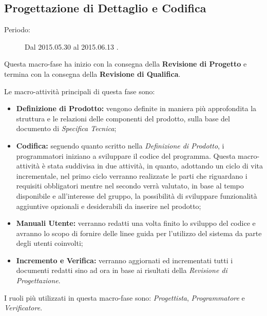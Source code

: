 \newpage
\subsection{Progettazione di Dettaglio e Codifica}
\begin{description}
	\item[Periodo:] Dal 2015.05.30 al 2015.06.13 .
\end{description}
Questa macro-fase ha inizio con la consegna della \textbf{Revisione di Progetto} e termina con la consegna della \textbf{Revisione di Qualifica}. 

\noindent Le macro-attività principali di questa fase sono:
\begin{itemize}
	\item \textbf{Definizione di Prodotto:} vengono definite in maniera più approfondita la struttura e le relazioni delle componenti del prodotto, sulla base del documento di \textit{Specifica Tecnica};
	\item \textbf{Codifica:} seguendo quanto scritto nella \textit{Definizione di Prodotto}, i programmatori iniziano a sviluppare il codice del programma. Questa macro-attività è stata suddivisa in due attività, in quanto, adottando un ciclo di vita incrementale, nel primo ciclo verranno realizzate le parti che riguardano i requisiti obbligatori mentre nel secondo verrà valutato, in base al tempo disponibile e all'interesse del gruppo, la possibilità di sviluppare funzionalità aggiuntive opzionali e desiderabili da inserire nel prodotto;
	\item \textbf{Manuali Utente:} verranno redatti una volta finito lo sviluppo del codice e avranno lo scopo di fornire delle linee guida per l'utilizzo del sistema da parte degli utenti coinvolti;
	\item \textbf{Incremento e Verifica:} verranno aggiornati ed incrementati tutti i documenti redatti sino ad ora in base ai risultati della \textit{Revisione di Progettazione}.
\end{itemize}
I ruoli più utilizzati in questa macro-fase sono: \textit{Progettista}, \textit{Programmatore} e \textit{Verificatore}. 
